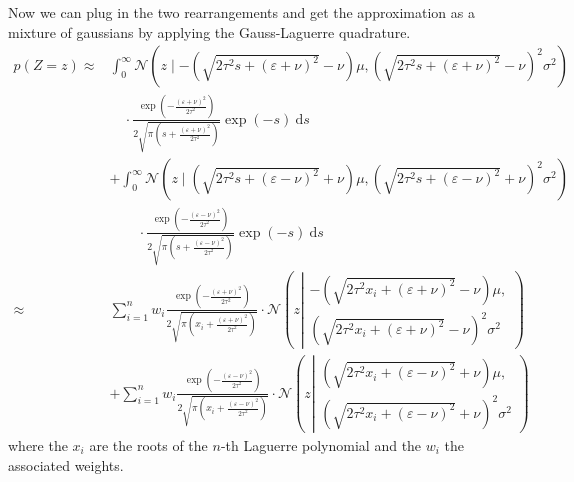 \documentclass[11pt,a4paper]{book}
\begin{document}
Now we can plug in the two rearrangements and get the approximation as a mixture
of gaussians by applying the Gauss-Laguerre quadrature.
\begin{align*}
  p(Z = z) \approx& \int_{0}^{\infty} \mathcal{N}\left( z \mid -\left( \sqrt{2\tau^{2}s + (\varepsilon + \nu)^{2}} - \nu \right)\mu, \left( \sqrt{2\tau^{2}s + (\varepsilon + \nu)^{2}} - \nu \right)^{2}\sigma^{2} \right)\\
&\quad \cdot \frac{\exp\left( -\frac{(\varepsilon + \nu)^{2}}{2\tau^{2}} \right)}{2 \sqrt{\pi \left( s + \frac{(\varepsilon + \nu)^{2}}{2\tau^{2}} \right)}} \exp(-s)~\mathrm{d}s\\
                  & + \int_{0}^{\infty} \mathcal{N}\left( z \mid \left( \sqrt{2\tau^{2} s + (\varepsilon - \nu)^{2}} + \nu \right)\mu, \left( \sqrt{2\tau^{2} s + (\varepsilon - \nu)^{2}} + \nu \right)^{2}\sigma^{2} \right)\\
                  &\qquad \cdot \frac{\exp\left( -\frac{(\varepsilon - \nu)^{2}}{2\tau^{2}} \right)}{2\sqrt{\pi \left( s + \frac{(\varepsilon - \nu)^{2}}{2\tau^{2}} \right)}} \exp(-s)~\mathrm{d}s\\
  \approx& \sum_{i = 1}^{n} w_{i} \frac{\exp\left( -\frac{(\varepsilon + \nu)^{2}}{2\tau^{2}} \right)}{2 \sqrt{\pi \left( x_{i} + \frac{(\varepsilon + \nu)^{2}}{2\tau^{2}} \right)}} \cdot \mathcal{N}\left( z \left|
           \begin{array}{c}
             -\left( \sqrt{2\tau^{2}x_{i} + (\varepsilon + \nu)^{2}} - \nu \right)\mu,\\
             \left( \sqrt{2\tau^{2}x_{i} + (\varepsilon + \nu)^{2}} - \nu \right)^{2}\sigma^{2}
           \end{array} \right.\right)\\
                  &+ \sum_{i = 1}^{n} w_{i} \frac{\exp\left( -\frac{(\varepsilon - \nu)^{2}}{2\tau^{2}} \right)}{2\sqrt{\pi \left( x_{i} + \frac{(\varepsilon - \nu)^{2}}{2\tau^{2}} \right)}} \cdot \mathcal{N}\left( z \left|
                    \begin{array}{c}
                      \left( \sqrt{2\tau^{2} x_{i} + (\varepsilon - \nu)^{2}} + \nu \right)\mu,\\
                      \left( \sqrt{2\tau^{2} x_{i} + (\varepsilon - \nu)^{2}} + \nu \right)^{2}\sigma^{2}
                    \end{array} \right.\right)
\end{align*}
where the $x_{i}$ are the roots of the $n$-th Laguerre polynomial and the
$w_{i}$ the associated weights.
\end{document}
